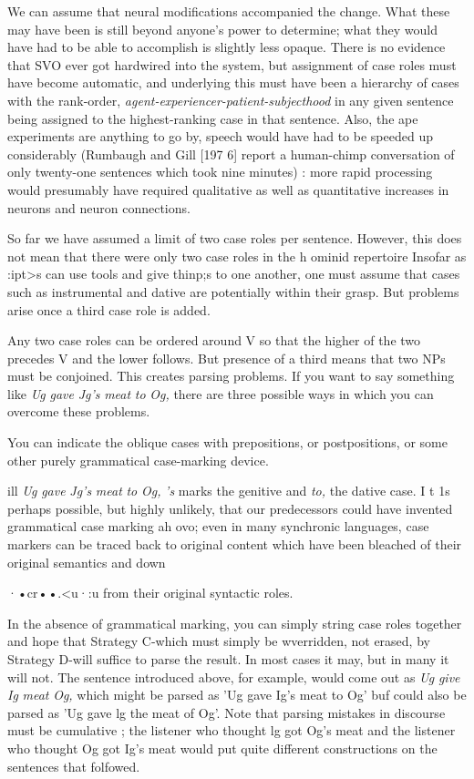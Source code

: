We can assume that neural modifications accompanied the change. What these may have been is still beyond anyone's power to determine; what they would have had to be able to accomplish is slightly less opaque. There is no evidence that SVO ever got hardwired into the system, but assignment of case roles must have become auto\-matic, and underlying this must have been a hierarchy of cases with the rank-order, \textit{agent-experiencer-patient-su}\textit{b}\textit{jecthood }in any given sen\-tence being assigned to the highest-ranking case in that sentence. Also, the ape experiments are anything to go by, speech would have had
to be speeded up considerably (Rumbaugh and Gill [197 6] report a human-chimp conversation of only twenty-one sentences which took nine minutes) : more rapid processing would presumably have required qualitative as well as quantitative increases in neurons and neuron connections.

So far we have assumed a limit of two case roles per sentence. However, this does not mean that there were only two case roles in the h ominid repertoire Insofar as :ipt{\textgreater}s can use tools and give thinp;s to one another, one must assume that cases such as instrumental and dative are potentially within their grasp. But problems arise once a third case role is added.

Any two case roles can be ordered around V so that the higher of the two precedes V and the lower follows. But presence of a third means that two NPs must be conjoined. This creates parsing problems. If you want to say something like \textit{Ug} \textit{gave} \textit{Jg's} \textit{meat} \textit{to} \textit{Og,} there are three possible ways in which you can overcome these problems.

You can indicate the oblique cases with prepositions, or post\-positions, or some other purely grammatical case-marking device.


ill \textit{Ug} \textit{gave} \textit{Jg's} \textit{meat} \textit{to} \textit{Og,} \textit{'s} marks the genitive and \textit{to,} the dative case. I t 1s perhaps possible, but highly unlikely, that our predecessors could have invented grammatical case marking ah ovo; even in many syn\-chronic languages, case markers can be traced back to original content which have been bleached of their original semantics and down\-

·•cr••.{\textless}u·:u from their original syntactic roles.

In the absence of grammatical marking, you can simply string case roles together and hope that Strategy C-which must simply be wverridden, not erased, by Strategy D-will suffice to parse the result. In most cases it may, but in many it will not. The sentence introduced above, for example, would come out as \textit{Ug} \textit{give} \textit{Ig} \textit{meat} \textit{Og,} which might be parsed as 'Ug gave Ig's meat to Og' buf could also be parsed as 'Ug gave lg the meat of Og'. Note that parsing mistakes in discourse must be cumulative ; the listener who thought lg got Og's meat and the listener who thought Og got Ig's meat would put quite different con\-structions on the sentences that folfowed.

